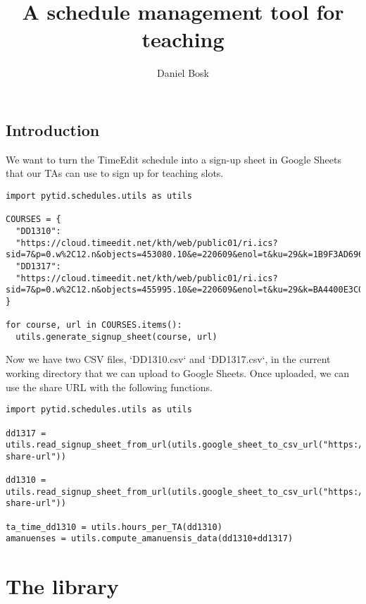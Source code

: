 \documentclass[a4paper,oneside]{book}
\title{%
  A schedule management tool for teaching
}
\author{%
  Daniel Bosk
}
\affil{%
  KTH EECS\\
  \texttt{dbosk@kth.se}
}
\newenvironment{abstract}{}{}
\begin{document}
\frontmatter
\maketitle

\vspace*{\fill}
\clearpage

\begin{abstract}
  
\end{abstract}
\clearpage

\tableofcontents
\clearpage

\mainmatter
\chapter{Introduction}

We want to turn the TimeEdit schedule into a sign-up sheet in Google Sheets 
that our TAs can use to sign up for teaching slots.
\begin{verbatim}
import pytid.schedules.utils as utils

COURSES = {
  "DD1310": 
  "https://cloud.timeedit.net/kth/web/public01/ri.ics?sid=7&p=0.w%2C12.n&objects=453080.10&e=220609&enol=t&ku=29&k=1B9F3AD696BCA5C434C68950EFD376DD",
  "DD1317": 
  "https://cloud.timeedit.net/kth/web/public01/ri.ics?sid=7&p=0.w%2C12.n&objects=455995.10&e=220609&enol=t&ku=29&k=BA4400E3C003685549BC65AD9EAD3DC58E"
}

for course, url in COURSES.items():
  utils.generate_signup_sheet(course, url)
\end{verbatim}

Now we have two CSV files, `DD1310.csv` and `DD1317.csv`, in the current 
working directory that we can upload to Google Sheets. Once uploaded, we can 
use the share URL with the following functions.
\begin{verbatim}
import pytid.schedules.utils as utils

dd1317 = utils.read_signup_sheet_from_url(utils.google_sheet_to_csv_url("https://docs.google.com/spreadsheets/d/the-share-url"))

dd1310 = utils.read_signup_sheet_from_url(utils.google_sheet_to_csv_url("https://docs.google.com/spreadsheets/d/the-share-url"))

ta_time_dd1310 = utils.hours_per_TA(dd1310)
amanuenses = utils.compute_amanuensis_data(dd1310+dd1317)
\end{verbatim}


\part{The library}





%
%



\backmatter
\printbibliography
\end{document}

